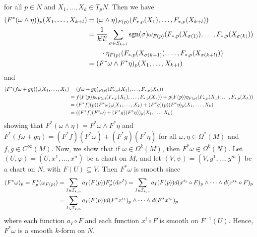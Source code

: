 for all $p \in N$ and $X_{1},\ldots,X_{k} \in T_{p}N$. Then we have
\begin{align}
    (F^{\ast}(\omega \wedge \eta))_{p}(X_{1},\ldots,X_{k+l}) &= (\omega \wedge \eta)_{F(p)}(F_{\ast,p}(X_{1}),\ldots,F_{\ast,p}(X_{k+l})) \notag \\ &= \frac{1}{k!l!} \sum_{\sigma \in S_{k+l}} \operatorname{sgn}(\sigma) \omega_{F(p)}(F_{\ast,p}(X_{\sigma(1)}),\ldots,F_{\ast,p}(X_{\sigma(k)})) \notag \\ &\qquad \cdot \eta_{F(p)}(F_{\ast,p}(X_{\sigma(k+1)}),\ldots,F_{\ast,p}(X_{\sigma(k+l)})) \notag \\ &= (F^{\ast}\omega \wedge F^{\ast}\eta)_{p}(X_{1},\ldots,X_{k+l})
\end{align}
and
\begin{align}
    (F^{\ast}(f\omega+g\eta))_{p}(X_{1},\ldots,X_{k}) &= (f\omega+g\eta)_{F(p)}(F_{\ast,p}(X_{1}),\ldots,F_{\ast,p}(X_{k})) \notag \\ &= f(F(p))\omega_{F(p)}(F_{\ast,p}(X_{1}),\ldots,F_{\ast,p}(X_{k})) + g(F(p))\eta_{F(p)}(F_{\ast,p}(X_{1}),\ldots,F_{\ast,p}(X_{k})) \notag \\ &= (F^{\ast}f)(p)(F^{\ast}\omega)_{p}(X_{1},\ldots,X_{k}) + (F^{\ast}g)(p)(F^{\ast}\eta)_{p}(X_{1},\ldots,X_{k}) \notag \\ &= ((F^{\ast}f)(F^{\ast}\omega) + (F^{\ast}g)(F^{\ast}\eta))_{p}(X_{1},\ldots,X_{k})
\end{align}
showing that $F^{\ast}(\omega \wedge \eta) = F^{\ast}\omega \wedge F^{\ast}\eta$ and $F^{\ast}(f\omega+g\eta) = (F^{\ast}f)(F^{\ast}\omega) + (F^{\ast}g)(F^{\ast}\eta)$ for all $\omega,\eta \in \Omega^{\ast}(M)$ and $f,g \in C^{\infty}(M)$. Now, we show that if $\omega \in \Omega^{k}(M)$, then $F^{\ast}\omega \in \Omega^{k}(N)$. Let $(U,\varphi) = (U,x^{1},\ldots,x^{n})$ be a chart on $M$, and let $(V,\psi) = (V,y^{1},\ldots,y^{m})$ be a chart on $N$, with $F(U) \subseteq V$. Then $F^{\ast}\omega$ is smooth since
\begin{align}
    (F^{\ast}\omega)_{p} = F^{\ast}_{p}(\omega_{F(p)}) &= \sum_{I \in \mathcal{I}_{k,n}} a_{I}(F(p)) F^{\ast}_{p}(dx^{I}) = \sum_{I \in \mathcal{I}_{k,n}} a_{I}(F(p)) d(x^{i_{1}} \circ F)_{p} \wedge \cdots \wedge d(x^{i_{k}} \circ F)_{p} \notag \\
    &= \sum_{I \in \mathcal{I}_{k,n}} a_{I}(F(p)) d(F^{\ast}x^{i_{1}})_{p} \wedge \cdots \wedge d(F^{\ast}x^{i_{k}})_{p}
\end{align}
where each function $a_{I} \circ F$ and each function $x^{i} \circ F$ is smooth on $F^{-1}(U)$. Hence, $F^{\ast}\omega$ is a smooth $k$-form on $N$.

